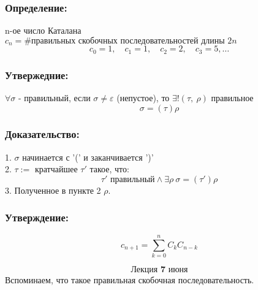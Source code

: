\documentclass[12pt, letterpaper, twoside]{article}
\begin{document}
    \subsubsection*{Определение:}
    n-ое число Каталана $c_n = \#\text{правильных скобочных последовательностей длины $2n$}$\\
    \[c_0 = 1,\quad c_1 = 1,\quad c_2 = 2,\quad c_3 = 5,\dots\]

    \subsubsection*{Утвержедние:}
    $\forall \sigma$ - правильный, если $\sigma \neq \varepsilon$ (непустое), то $\exists ! (\tau,\ \rho)$ правильное
    \[\sigma = (\tau)\rho\]
    \subsubsection*{Доказательство:}
    1. $\sigma$ начинается с '(' и заканчивается ')'\\
    2. $\tau:=$ кратчайшее $\tau'$ такое, что:
    \[\tau' \text{ правильный} \wedge \exists \rho\ \sigma = (\tau')\rho\]
    3. Полученное в пункте 2 $\rho$.\\
    
    \subsubsection*{Утверждение:}
    \[c_{n + 1} = \sum_{k = 0}^{n} C_k C_{n - k}\]
    
\[\textbf{Лекция 7 июня}\]    
    Вспоминаем, что такое правильная скобочная последовательность.
    
\end{document}
